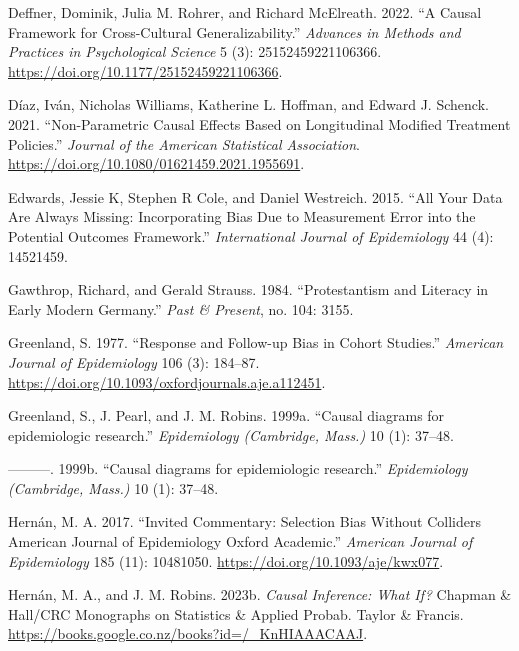 \documentclass[
  singlecolumn]{report}
\newlength{\cslhangindent}
\newlength{\cslentryspacingunit} %
\newenvironment{CSLReferences}[2] %
 {%
  \setlength{\parindent}{0pt}
  \ifodd #1
  \let\oldpar\par
  \def\par{\hangindent=\cslhangindent\oldpar}
  \fi
  \setlength{\parskip}{#2\cslentryspacingunit}
 }%
 {}
\begin{document}
\begin{CSLReferences}{1}{0}
\leavevmode{}%
Deffner, Dominik, Julia M. Rohrer, and Richard McElreath. 2022. {``A
Causal Framework for Cross-Cultural Generalizability.''} \emph{Advances
in Methods and Practices in Psychological Science} 5 (3):
25152459221106366. \url{https://doi.org/10.1177/25152459221106366}.

\leavevmode{}%
Díaz, Iván, Nicholas Williams, Katherine L. Hoffman, and Edward J.
Schenck. 2021. {``Non-Parametric Causal Effects Based on Longitudinal
Modified Treatment Policies.''} \emph{Journal of the American
Statistical Association}.
\url{https://doi.org/10.1080/01621459.2021.1955691}.

\leavevmode{}%
Edwards, Jessie K, Stephen R Cole, and Daniel Westreich. 2015. {``All
Your Data Are Always Missing: Incorporating Bias Due to Measurement
Error into the Potential Outcomes Framework.''} \emph{International
Journal of Epidemiology} 44 (4): 14521459.

\leavevmode{}%
Gawthrop, Richard, and Gerald Strauss. 1984. {``Protestantism and
Literacy in Early Modern Germany.''} \emph{Past \& Present}, no. 104:
3155.

\leavevmode{}%
Greenland, S. 1977. {``Response and Follow-up Bias in Cohort Studies.''}
\emph{American Journal of Epidemiology} 106 (3): 184--87.
\url{https://doi.org/10.1093/oxfordjournals.aje.a112451}.

\leavevmode{}%
Greenland, S., J. Pearl, and J. M. Robins. 1999a. {``Causal diagrams for
epidemiologic research.''} \emph{Epidemiology (Cambridge, Mass.)} 10
(1): 37--48.

\leavevmode{}%
---------. 1999b. {``Causal diagrams for epidemiologic research.''}
\emph{Epidemiology (Cambridge, Mass.)} 10 (1): 37--48.

\leavevmode{}%
Hernán, M. A. 2017. {``Invited Commentary: Selection Bias Without
Colliders \textbar{} American Journal of Epidemiology \textbar{} Oxford
Academic.''} \emph{American Journal of Epidemiology} 185 (11): 10481050.
\url{https://doi.org/10.1093/aje/kwx077}.

\leavevmode{}%
Hernán, M. A., and J. M. Robins. 2023b. \emph{Causal Inference: What
If?} Chapman \& Hall/CRC Monographs on Statistics \& Applied Probab.
Taylor \& Francis.
\url{https://books.google.co.nz/books?id=/_KnHIAAACAAJ}.


\end{CSLReferences}
\end{document}
